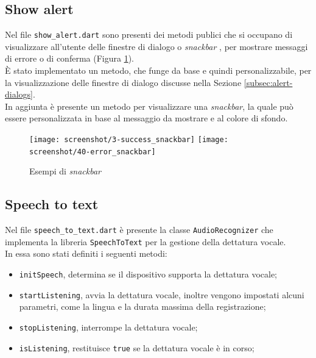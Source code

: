 \subsection{Show alert}
\label{subsec:show-alert}

Nel file \lstinline{show_alert.dart} sono presenti dei metodi publici che si occupano di visualizzare all'utente delle finestre di dialogo o \emph{snackbar} \cite{site:snackbar}, per mostrare messaggi di errore o di conferma (Figura \ref{fig:snackbar}). \\
È stato implementato un metodo, che funge da base e quindi personalizzabile, per la visualizzazione delle finestre di dialogo discusse nella Sezione \ref{subsec:alert-dialogs}. \\
In aggiunta è presente un metodo per visualizzare una \emph{snackbar}, la quale può essere personalizzata in base al messaggio da mostrare e al colore di sfondo.

\begin{figure}[!h] 
    \centering 
    \texttt{[image: screenshot/3-success\_snackbar]} 
    \hfill
    \texttt{[image: screenshot/40-error\_snackbar]}
    \caption{Esempi di \emph{snackbar}}
    \label{fig:snackbar}
\end{figure}

\subsection{Speech to text}
\label{subsec:speech-to-text}

Nel file \lstinline{speech_to_text.dart} è presente la classe \lstinline{AudioRecognizer} che implementa la libreria \lstinline{SpeechToText} \cite{site:speech-to-text} per la gestione della dettatura vocale. \\
In essa sono stati definiti i seguenti metodi:
\begin{itemize}
    \item \lstinline{initSpeech}, determina se il dispositivo supporta la dettatura vocale;
    \item \lstinline{startListening}, avvia la dettatura vocale, inoltre vengono impostati alcuni parametri, come la lingua e la durata massima della registrazione;
    \item \lstinline{stopListening}, interrompe la dettatura vocale;
    \item \lstinline{isListening}, restituisce \lstinline{true} se la dettatura vocale è in corso;
\end{itemize}

